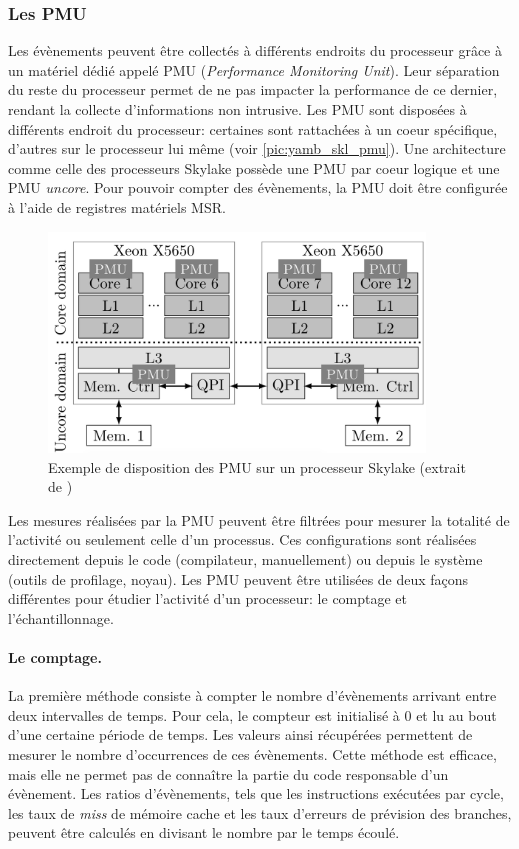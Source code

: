         
    
    \subsubsection{Les PMU}
    
        Les évènements peuvent être collectés à différents endroits du processeur grâce à un matériel dédié appelé PMU (\textit{Performance Monitoring Unit}). Leur séparation du reste du processeur permet de ne pas impacter la performance de ce dernier, rendant la collecte d'informations non intrusive. Les PMU sont disposées à différents endroit du processeur: certaines sont rattachées à un coeur spécifique, d'autres sur le processeur lui même (voir \autoref{pic:yamb_skl_pmu}).  Une architecture comme celle des processeurs Skylake possède une PMU par coeur logique et une PMU \textit{uncore}.  Pour pouvoir compter des évènements, la PMU doit être configurée à l'aide de registres matériels MSR.
        
        \begin{figure}[h!]
        \center
        \includegraphics[width=10cm]{images/yamb_skl_pmu.png}
        \caption{\label{pic:yamb_skl_pmu}Exemple de disposition des PMU sur un processeur Skylake (extrait de \cite{Selva2017})}
        \end{figure}
        
        Les mesures réalisées par la PMU peuvent être filtrées pour mesurer la totalité de l'activité ou seulement celle d'un processus. Ces configurations sont réalisées  directement depuis le code (compilateur, manuellement) ou depuis le système (outils de profilage, noyau). Les PMU peuvent être utilisées de deux façons différentes pour étudier l'activité d'un processeur: le comptage et l'échantillonnage. 
        
        \paragraph{Le comptage.} La première méthode consiste à compter le nombre d'évènements arrivant entre deux intervalles de temps. Pour cela, le compteur est initialisé à $0$ et lu au bout d'une certaine période de temps. Les valeurs ainsi récupérées permettent de mesurer le nombre d'occurrences de ces évènements. Cette méthode est efficace, mais elle ne permet pas de connaître la partie du code responsable d'un évènement. Les ratios d'évènements, tels que les instructions exécutées par cycle, les taux de \textit{miss} de mémoire cache et les taux d'erreurs de prévision des branches, peuvent être calculés en divisant le nombre par le temps écoulé.
        

